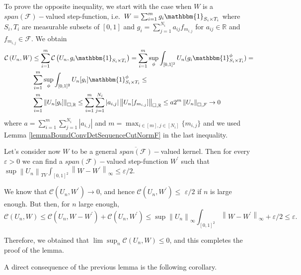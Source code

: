 \documentclass[11pt]{article}
\def\R{\mathbb{R}}
\newcommand{\cF}{{\mathcal F}}  %
\begin{document}
To prove the opposite inequality, we start with the case when $W$ is a $span(\cF)-$valued step-function, i.e.\ $W=\sum^m_{i=1}g_i\mathbbm{1}_{S_i\times T_i}$ where $S_i,T_i$ are measurable subsets of $[0,1]$ and $g_i=\sum^{N_i}_{j=1}a_{ij}f_{m_{i,j}}$ for $a_{ij}\in \R$ and $f_{m_{i,j}}\in \cF.$ We obtain
$$
\begin{aligned}
\mathcal{C}\left(U_n, W\right) & \leq \sum_{i=1}^m \mathcal{C}\left(U_n, g_i \mathbbm{1}_{S_i \times T_i}\right)=\sum_{i=1}^m\sup_{\phi}\int_{[0,1]^2}U_n(g_i \mathbbm{1}^{\phi}_{S_i \times T_i}) = \\ & \sum_{i=1}^m\sup_{\phi}\int_{[0,1]^2}U_n[g_i] \mathbbm{1}^{\phi}_{S_i \times T_i}\leq\\
&  \sum_{i=1}^m\left\|U_n[g_i]\right\|_{\square,\R}\leq \sum_{i=1}^m\sum_{j=1}^{N_i}|a_{i,j}|\left\|U_n[f_{m_{i,j}}]\right\|_{\square,\R}\leq a2^m \left\|U_n\right\|_{\square,\cF}\rightarrow 0 
\end{aligned}
$$
where $a=\sum_{i=1}^m\sum_{j=1}^{N_i}|a_{i,j}|$ and $m=\max_{i\in [m],j\in [N_i]}\{m_{i,j}\}$ and we used Lemma \ref{lemmaBoundConvDetSequenceCutNormF} in the last inequality.


Let's consider now $W$ to be a general $\overline{span(\cF)}-$valued kernel. Then for every $\varepsilon>0$ we can find a $span(\cF)-$valued step-function $W^{\prime}$ such that $\sup\left\|U_n\right\|_{TV}\int_{[0,1]^2}\left\|W-W^{\prime}\right\|_{\infty}  \leq \varepsilon / 2.$

We know that $\mathcal{C}\left(U_n, W^{\prime}\right) \rightarrow 0$, and hence $\mathcal{C}\left(U_n, W^{\prime}\right) \leq$ $\varepsilon / 2$ if $n$ is large enough. But then, for $n$ large enough, 
$$
\mathcal{C}\left(U_n, W\right) \leq \mathcal{C}\left(U_n, W-W^{\prime}\right)+\mathcal{C}\left(U_n, W^{\prime}\right) \leq\sup\left\|U_n\right\|_{\infty}\int_{[0,1]^2}\left\|W-W^{\prime}\right\|_{\infty} +\varepsilon / 2 \leq \varepsilon .
$$

Therefore, we obtained that $\lim \sup _n \mathcal{C}\left(U_n, W\right) \leq 0$, and this completes the proof of the lemma.
\endproof

A direct consequence of the previous lemma is the following corollary.
\end{document}
